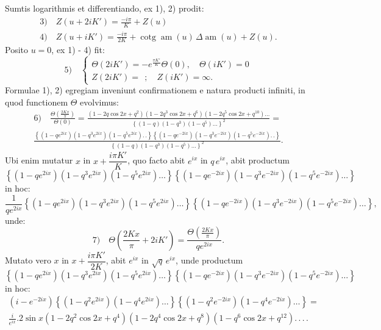 \documentclass{article}
\begin{document}
Sumtis logarithmis et differentiando, ex 1), 2) prodit:
\[
\begin{gathered}
\text{3)}\quad Z(u+2iK')=\frac{-i\pi}{K}+Z(u)\\[1.5ex]
\text{4)}\quad Z(u+iK')=\frac{-i\pi}{2K}+\operatorname{cotg}\operatorname{am}(u)\,\Delta\operatorname{am}(u)+Z(u).
\end{gathered}
\]
Posito $u=0$, ex 1) - 4) fit:
\[
\text{5)}\quad \left\{\begin{gathered}
\Theta(2iK')=-e^{\frac{\pi K'}{K}}\Theta(0),\quad \Theta(iK')=0\\[1ex]
Z(2iK')=\ \ ;\quad Z(iK')=\infty.
\end{gathered}\right.
\]
Formulae 1), 2) egregiam inveniunt confirmationem e natura producti infiniti, in quod functionem $\Theta$ evolvimus:
\[
\begin{gathered}
\text{6)}\quad \frac{\Theta\left(\frac{2Kx}{\pi}\right)}{\Theta(0)}=\frac{(1-2q\cos2x+q^{2})(1-2q^{3}\cos2x+q^{6})(1-2q^{5}\cos2x+q^{10})\ldots}{\left\{(1-q)(1-q^{3})(1-q^{5})\ldots\right\}^{2}}=\\[1.5ex]
\frac{\left\{(1-qe^{2ix})(1-q^{3}e^{2ix})(1-q^{5}e^{2ix}).\,.\right\}\left\{(1-qe^{-2ix})(1-q^{3}e^{-2ix})(1-q^{5}e^{-2ix}).\,.\right\}}{\left\{(1-q)(1-q^{3})(1-q^{5})\ldots\right\}^{2}}.
\end{gathered}
\]
Ubi enim mutatur $x$ in $x+\dfrac{i\pi K'}{K}$, quo facto abit $e^{ix}$ in $q\,e^{ix}$, abit productum
\[
\left\{(1-qe^{2ix})(1-q^{3}e^{2ix})(1-q^{5}e^{2ix})\ldots\right\}\left\{(1-qe^{-2ix})(1-q^{3}e^{-2ix})(1-q^{5}e^{-2ix})\ldots\right\}
\]
in hoc:
\[
\frac{1}{qe^{2ix}}\left\{(1-qe^{2ix})(1-q^{3}e^{2ix})(1-q^{5}e^{2ix})\ldots\right\}\left\{(1-qe^{-2ix})(1-q^{3}e^{-2ix})(1-q^{5}e^{-2ix})\ldots\right\},
\]
unde:
\[
\text{7)}\quad \Theta\left(\frac{2Kx}{\pi}+2iK'\right)=\frac{\Theta\left(\frac{2Kx}{\pi}\right)}{qe^{2ix}}.
\]
Mutato vero $x$ in $x+\dfrac{i\pi K'}{2K}$, abit $e^{ix}$ in $\sqrt{q}\,e^{ix}$, unde productum
\[
\left\{(1-qe^{2ix})(1-q^{3}e^{2ix})(1-q^{5}e^{2ix})\ldots\right\}\left\{(1-qe^{-2ix})(1-q^{3}e^{-2ix})(1-q^{5}e^{-2ix})\ldots\right\}
\]
in hoc:
\[
\begin{gathered}
(i-e^{-2ix})\left\{(1-q^{2}e^{2ix})(1-q^{4}e^{2ix})\ldots\right\}\left\{(1-q^{2}e^{-2ix})(1-q^{4}e^{-2ix})\ldots\right\}=\\[1.5ex]
\frac{i}{e^{ix}}.2\sin x(1-2q^{2}\cos2x+q^{4})(1-2q^{4}\cos2x+q^{8})(1-q^{6}\cos2x+q^{12}).\,.\,.\,.
\end{gathered}
\]
\end{document}
